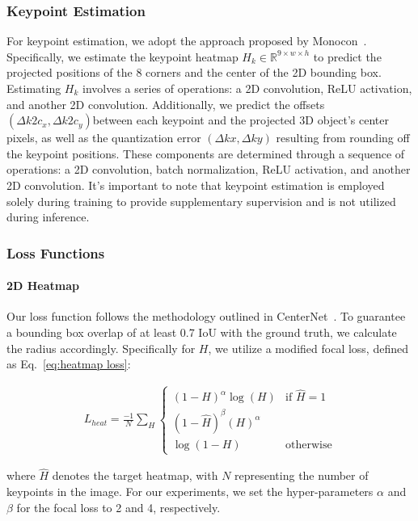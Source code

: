 \documentclass[journal]{IEEEtran}
\newcommand{\R}{\mathbb{R}}
\begin{document}
	\subsubsection{Keypoint Estimation}
	For keypoint estimation, we adopt the approach proposed by Monocon~\cite{monocon}. Specifically, we estimate the keypoint heatmap $H_k \in \R^{9\times w \times h}$ to predict the projected positions of the 8 corners and the center of the 2D bounding box. Estimating $H_k$ involves a series of operations: a 2D convolution, ReLU activation, and another 2D convolution. Additionally, we predict the offsets $(\Delta k2c_x, \Delta k2c_y)$between each keypoint and the projected 3D object's center pixels, as well as the quantization error $(\Delta kx, \Delta ky)$ resulting from rounding off the keypoint positions. These components are determined through a sequence of operations: a 2D convolution, batch normalization, ReLU activation, and another 2D convolution. It's important to note that keypoint estimation is employed solely during training to provide supplementary supervision and is not utilized during inference.
	
	\subsubsection{Loss Functions}
	\paragraph{2D Heatmap} Our loss function follows the methodology outlined in CenterNet~\cite{centernet}. To guarantee a bounding box overlap of at least 0.7 IoU with the ground truth, we calculate the radius accordingly. Specifically for $H$, we utilize a modified focal loss, defined as Eq.~\eqref{eq:heatmap loss}:
	
	\begin{equation}
		\begin{split}
		L_{heat}=\frac{-1}N\sum_{H}\begin{cases}(1-H)^\alpha\log(H)&\text{if }\hat{H}=1\\(1-\hat{H})^\beta({H})^\alpha \\ \log(1-{H}) &\text{otherwise}\end{cases}
		\label{eq:heatmap loss}
		\end{split}
	\end{equation}

	where $\hat{H}$ denotes the target heatmap, with $N$ representing the number of keypoints in the image. For our experiments, we set the hyper-parameters $\alpha$ and $\beta$ for the focal loss to 2 and 4, respectively.
	
\end{document}
